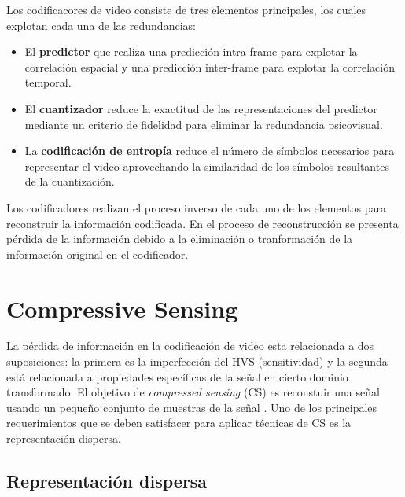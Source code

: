 Los codificacores de video consiste de tres elementos principales, los cuales explotan cada una de las redundancias:
\begin{itemize}
	\item El \textbf{predictor} que realiza una predicci\'on intra-frame para explotar la correlaci\'on espacial y una predicci\'on inter-frame para explotar la correlaci\'on temporal. 
	\item El \textbf{cuantizador} reduce la exactitud de las representaciones del predictor mediante un criterio de fidelidad para eliminar la redundancia psicovisual.
	\item La \textbf{codificaci\'on de entrop\'ia} reduce el n\'umero de s\'imbolos necesarios para representar el video aprovechando la similaridad de los s\'imbolos resultantes de la cuantizaci\'on.
\end{itemize}

Los codificadores realizan el proceso inverso de cada uno de los elementos para reconstruir la informaci\'on codificada. En el proceso de reconstrucci\'on se presenta p\'erdida de la informaci\'on debido a la eliminaci\'on o tranformaci\'on de la informaci\'on original en el codificador.

\section{Compressive Sensing}

La p\'erdida de informaci\'on en la codificaci\'on de video esta relacionada a dos suposiciones: la primera es la imperfecci\'on del HVS (sensitividad) y la segunda est\'a relacionada a propiedades espec\'ificas de la se\~nal en cierto dominio transformado. El objetivo de \textit{compressed sensing} (CS) es reconstuir una se\~nal usando un peque\~no conjunto de muestras de la se\~nal \cite{compressive}. Uno de los principales requerimientos que se deben satisfacer para aplicar t\'ecnicas de CS es la representaci\'on dispersa. 

\subsection{Representaci\'on dispersa}

